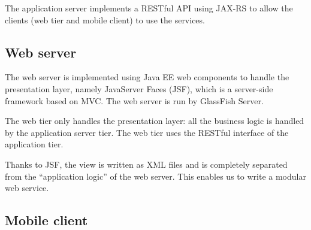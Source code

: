 The application server implements a RESTful API using JAX-RS to allow the clients (web tier and mobile client) to use the services.

\subsection{Web server}
The web server is implemented using Java EE web components to handle the presentation layer, namely JavaServer Faces (JSF), which is a server-side framework based on MVC.
The web server is run by GlassFish Server.

The web tier only handles the presentation layer: all the business logic is handled by the application server tier. The web tier uses the RESTful interface of the application tier.

Thanks to JSF, the view is written as XML files and is completely separated from the ``application logic'' of the web server. This enables us to write a modular web service.

\subsection{Mobile client}
